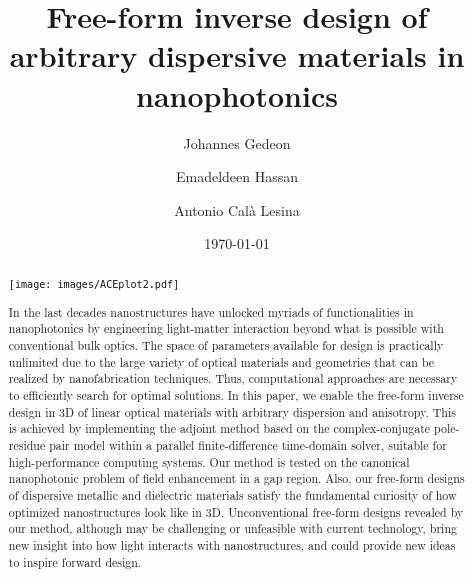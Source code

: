 \documentclass[aps,prl,twocolumn,superscriptaddress,longbibliography]{revtex4-1}
\begin{document}
\author{Johannes Gedeon}
\author{Emadeldeen Hassan}
\author{Antonio Cal{\`a} Lesina}


\title{Free-form inverse design of arbitrary dispersive materials in nanophotonics}

\date{\today}

\vspace{3cm}
\begin{abstract}

{\centering
\texttt{[image: images/ACEplot2.pdf]}

}
In the last decades nanostructures have unlocked myriads of functionalities in nanophotonics by engineering light-matter interaction beyond what is possible with conventional bulk optics. The space of parameters available for design is practically unlimited due to the large variety of optical materials and geometries that can be realized by nanofabrication techniques. Thus, computational approaches are necessary to efficiently search for optimal solutions. In this paper, we enable the free-form inverse design in 3D of linear optical materials with arbitrary dispersion and anisotropy.
This is achieved by implementing the adjoint method based on the complex-conjugate pole-residue pair model within a parallel finite-difference time-domain solver, suitable for high-performance computing systems. 
Our method is tested on the canonical nanophotonic problem of field enhancement in a gap region. Also, our free-form designs of dispersive metallic and dielectric materials satisfy the fundamental curiosity of how optimized nanostructures look like in 3D. Unconventional free-form designs revealed by our method, although may be challenging or unfeasible with current technology, bring new insight into how light interacts with nanostructures, and could provide new ideas to inspire forward design.
\end{abstract}
\maketitle
\end{document}
